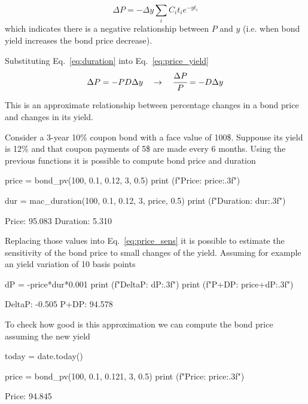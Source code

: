\begin{equation}
\Delta P = -\Delta y\sum_i C_i t_i e^{-yt_i}
\label{eq:price_yield}
\end{equation}
\noindent
which indicates there is a negative relationship between $P$ and $y$ (i.e. when bond yield increases the bond price decrease). 

Substituting Eq.~\ref{eq:duration} into Eq.~\ref{eq:price_yield} 
\begin{equation}
\Delta P = -PD\Delta y \quad\rightarrow\quad \cfrac{\Delta P}{P} = -D\Delta y
\label{eq:price_sens}
\end{equation}

This is an approximate relationship between percentage changes in a bond price and changes in its yield.

Consider a 3-year 10\% coupon bond with a face value of 100\$. Suppouse its yield is 12\% and that coupon payments of 5\$ are made every 6 months. Using the previous functions it is possible to compute bond price and duration

\begin{ipythonnon}
price = bond_pv(100, 0.1, 0.12, 3, 0.5)
print (f"Price: {price:.3f}")

dur = mac_duration(100, 0.1, 0.12, 3, price, 0.5)
print (f"Duration: {dur:.3f}")
\end{ipythonnon}
\begin{ioutput}
Price: 95.083
Duration: 5.310
\end{ioutput}

Replacing those values into Eq.~\ref{eq:price_sens} it is possible to estimate the sensitivity of the bond price to small changes of the yield.
Assuming for example an yield variation of 10 basis points
\begin{ipythonnon}
dP = -price*dur*0.001
print (f"DeltaP: {dP:.3f}")
print (f"P+DP: {price+dP:.3f}")
\end{ipythonnon}
\begin{ioutput}
DeltaP: -0.505
P+DP: 94.578
\end{ioutput}

To check how good is this approximation we can compute the bond price assuming the new yield
\begin{ipythonnon}
today = date.today()

price = bond_pv(100, 0.1, 0.121, 3, 0.5)
print (f"Price: {price:.3f}")
\end{ipythonnon}
\begin{ioutput}
Price: 94.845
\end{ioutput}

